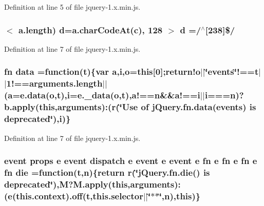 Definition at line 5 of file jquery-\/1.\+x.\+min.\+js.

\subsubsection[{\texorpdfstring{d}{d}}]{$<$ {\bf a.\+length}) d=a.\+char\+Code\+At({\bf c}), 128 $>$ d =/$^\wedge$\mbox{[}238\mbox{]}\$/}\hypertarget{jquery-1_8x_8min_8js_aee5af4e0aaa2cfde6be1272633d18b59}{}\label{jquery-1_8x_8min_8js_aee5af4e0aaa2cfde6be1272633d18b59}


Definition at line 7 of file jquery-\/1.\+x.\+min.\+js.

\subsubsection[{\texorpdfstring{data}{data}}]{ {\bf fn} data =function({\bf t})\{var {\bf a},{\bf i},{\bf o}={\bf this}\mbox{[}0\mbox{]};return!o$\vert$$\vert$\char`\"{}events\char`\"{}!==t$\vert$$\vert$1!=={\bf arguments.\+length}$\vert$$\vert$({\bf a}=e.\+data({\bf o},{\bf t}),{\bf i}=e.\+\_\+data({\bf o},{\bf t}),a!=={\bf n}\&\&a!=={\bf i}$\vert$$\vert${\bf i}==={\bf n})?b.\+apply({\bf this},arguments)\+:(r(\char`\"{}Use of j\+Query.\+fn.\+data(\textquotesingle{}events\textquotesingle{}) is deprecated\char`\"{}),i)\}}\hypertarget{jquery-1_8x_8min_8js_a7f60fda3d1d4191e549df075eeacf25b}{}\label{jquery-1_8x_8min_8js_a7f60fda3d1d4191e549df075eeacf25b}


Definition at line 7 of file jquery-\/1.\+x.\+min.\+js.

\subsubsection[{\texorpdfstring{die}{die}}]{ event props {\bf e} event dispatch {\bf e} event {\bf e} event {\bf e} {\bf fn} {\bf e} {\bf fn} {\bf e} {\bf fn} {\bf e} {\bf fn} die =function({\bf t},{\bf n})\{return r(\char`\"{}j\+Query.\+fn.\+die() is deprecated\char`\"{}),M?M.\+apply({\bf this},arguments)\+:({\bf e}(this.\+context).off({\bf t},this.\+selector$\vert$$\vert$\char`\"{}$\ast$$\ast$\char`\"{},{\bf n}),{\bf this})\}}\hypertarget{jquery-1_8x_8min_8js_a8000af92246746444c1d08e9650d86af}{}\label{jquery-1_8x_8min_8js_a8000af92246746444c1d08e9650d86af}


